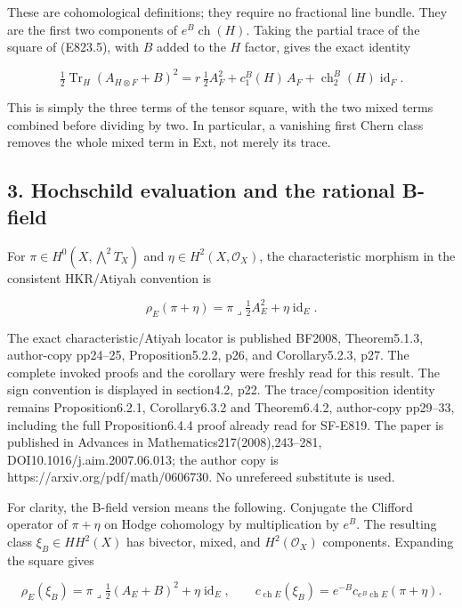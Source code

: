 These are cohomological definitions; they require no fractional line
bundle. They are the first two components of
\(e^B\operatorname{ch}(H)\). Taking the partial trace of the square of
(E823.5), with \(B\) added to the \(H\) factor, gives the exact identity

\[
 \tfrac12\operatorname{Tr}_H(A_{H\otimes F}+B)^2
  =r\,\tfrac12 A_F^2
    +c_1^B(H)\,A_F
    +\operatorname{ch}_2^B(H)\operatorname{id}_F.
 \tag{E823.7}
\]

This is simply the three terms of the tensor square, with the two mixed
terms combined before dividing by two. In particular, a vanishing first
Chern class removes the whole mixed term in Ext, not merely its trace.

\subsection{3. Hochschild evaluation and the rational
B-field}\label{SF-E823-hochschild-evaluation-and-the-rational-b-field}

For \(\pi\in H^0(X,\bigwedge^2T_X)\) and
\(\eta\in H^2(X,\mathcal O_X)\), the characteristic morphism in the
consistent HKR/Atiyah convention is

\[
 \rho_E(\pi+\eta)=
       \pi\mathbin{\lrcorner}\tfrac12 A_E^2
                         +\eta\operatorname{id}_E.
 \tag{E823.8}
\]

The exact characteristic/Atiyah locator is published BF2008,
Theorem5.1.3, author-copy pp24--25, Proposition5.2.2, p26, and
Corollary5.2.3, p27. The complete invoked proofs and the corollary were
freshly read for this result. The sign convention is displayed in
section4.2, p22. The trace/composition identity remains
Proposition6.2.1, Corollary6.3.2 and Theorem6.4.2, author-copy pp29--33,
including the full Proposition6.4.4 proof already read for SF-E819. The
paper is published in Advances in Mathematics217(2008),243--281,
DOI10.1016/j.aim.2007.06.013; the author copy is
https://arxiv.org/pdf/math/0606730. No unrefereed substitute is used.

For clarity, the B-field version means the following. Conjugate the
Clifford operator of \(\pi+\eta\) on Hodge cohomology by multiplication
by \(e^B\). The resulting class \(\xi_B\in HH^2(X)\) has bivector,
mixed, and \(H^2(\mathcal O_X)\) components. Expanding the square gives

\[
 \rho_E(\xi_B)=
       \pi\mathbin{\lrcorner}\tfrac12(A_E+B)^2
                         +\eta\operatorname{id}_E,
 \qquad
 c_{\operatorname{ch}E}(\xi_B)
    =e^{-B}c_{e^B\operatorname{ch}E}(\pi+\eta).
 \tag{E823.9}
\]

